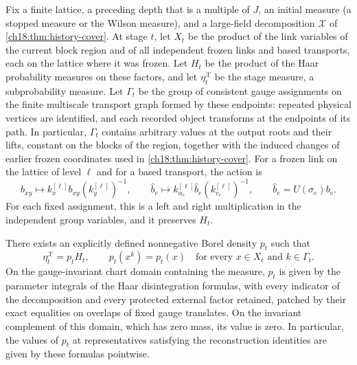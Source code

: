 \begin{theorem}\label{ch18:thm:canonical-density}
Fix a finite lattice, a preceding depth that is a multiple of $J$, an initial measure (a stopped measure or the Wilson measure), and a large-field decomposition $\mathcal X$ of \cref{ch18:thm:history-cover}. At stage $t$, let $X_t$ be the product of the link variables of the current block region and of all independent frozen links and based transports, each on the lattice where it was frozen. Let $H_t$ be the product of the Haar probability measures on these factors, and let $\eta_t^{\mathcal X}$ be the stage measure, a subprobability measure. Let $\Gamma_t$ be the group of consistent gauge assignments on the finite multiscale transport graph formed by these endpoints: repeated physical vertices are identified, and each recorded object transforms at the endpoints of its path. In particular, $\Gamma_t$ contains arbitrary values at the output roots and their lifts, constant on the blocks of the region, together with the induced changes of earlier frozen coordinates used in \cref{ch18:thm:history-cover}. For a frozen link on the lattice of level $\ell$ and for a based transport, the action is
\[
 b_{xy}\longmapsto k_x^{[\ell]}b_{xy}(k_y^{[\ell]})^{-1},
 \qquad
 \widehat b_e\longmapsto
 k_{\alpha_e}^{[\ell]}\widehat b_e(k_{v_e}^{[\ell]})^{-1},
 \qquad \widehat b_e=U(\sigma_e)b_e.
\]
For each fixed assignment, this is a left and right multiplication in the independent group variables, and it preserves $H_t$.

There exists an explicitly defined nonnegative Borel density $p_t$ such that
\[
 \eta_t^{\mathcal X}=p_tH_t,
 \qquad p_t(x^k)=p_t(x)
             \quad\text{for every }x\in X_t\text{ and }k\in\Gamma_t.
\]
On the gauge-invariant chart domain containing the measure, $p_t$ is given by the parameter integrals of the Haar disintegration formulas, with every indicator of the decomposition and every protected external factor retained, patched by their exact equalities on overlaps of fixed gauge translates. On the invariant complement of this domain, which has zero mass, its value is zero. In particular, the values of $p_t$ at representatives satisfying the reconstruction identities are given by these formulas pointwise.


\end{theorem}
